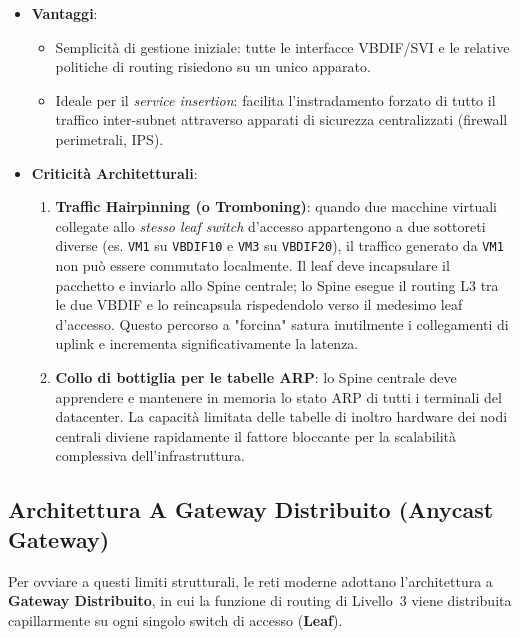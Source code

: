 \documentclass[11pt, a4paper]{article}
\begin{document}
\begin{itemize}
    \item \textbf{Vantaggi}:
    \begin{itemize}[noitemsep]
        \item Semplicità di gestione iniziale: tutte le interfacce VBDIF/SVI e le relative politiche di routing risiedono su un unico apparato.
        \item Ideale per il \emph{service insertion}: facilita l'instradamento forzato di tutto il traffico inter-subnet attraverso apparati di sicurezza centralizzati (firewall perimetrali, IPS).
    \end{itemize}
    \item \textbf{Criticità Architetturali}:
    \begin{enumerate}
        \item \textbf{Traffic Hairpinning (o Tromboning)}: quando due macchine virtuali collegate allo \emph{stesso leaf switch} d'accesso appartengono a due sottoreti diverse (es. \texttt{VM1} su \texttt{VBDIF10} e \texttt{VM3} su \texttt{VBDIF20}), il traffico generato da \texttt{VM1} non può essere commutato localmente. Il leaf deve incapsulare il pacchetto e inviarlo allo Spine centrale; lo Spine esegue il routing L3 tra le due VBDIF e lo reincapsula rispedendolo verso il medesimo leaf d'accesso. Questo percorso a "forcina" satura inutilmente i collegamenti di uplink e incrementa significativamente la latenza.
        \item \textbf{Collo di bottiglia per le tabelle ARP}: lo Spine centrale deve apprendere e mantenere in memoria lo stato ARP di tutti i terminali del datacenter. La capacità limitata delle tabelle di inoltro hardware dei nodi centrali diviene rapidamente il fattore bloccante per la scalabilità complessiva dell'infrastruttura.
    \end{enumerate}
\end{itemize}

\subsection{Architettura A Gateway Distribuito (Anycast Gateway)}

Per ovviare a questi limiti strutturali, le reti moderne adottano l'architettura a \textbf{Gateway Distribuito}, in cui la funzione di routing di Livello~3 viene distribuita capillarmente su ogni singolo switch di accesso (\textbf{Leaf}).

\end{document}
